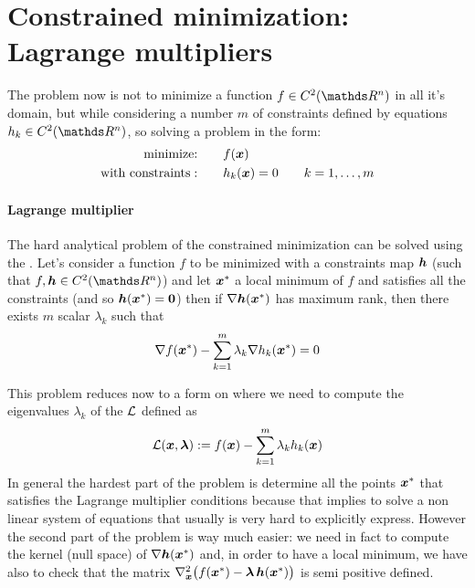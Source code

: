 \section{Constrained minimization: Lagrange multipliers}
	The problem now is not to minimize a function $f\in C^2(\R^n)$ in all it's domain, but while considering a number $m$ of constraints defined by equations $h_k\in C^2(\R^n)$, so solving a problem in the form:
	\begin{align*}
		\textrm{minimize:} \qquad & f(\boldsymbol{x}) \\
		\textrm{with constraints}: \qquad & h_k(\boldsymbol{x}) = 0 \qquad k = 1,\dots, m
	\end{align*}
	
	\paragraph{Lagrange multiplier} The hard analytical problem of the constrained minimization can be solved using the . Let's consider a function $f$ to be minimized with a constraints map $\boldsymbol{h}$ (such that $f,\vett h \in C^2(\R^n)$) and let $\boldsymbol{x}^*$ a local minimum of $f$ and satisfies all the constraints (and so $\boldsymbol{h}(\boldsymbol{x}^*) = \boldsymbol{0}$) then if $\nabla \boldsymbol{h}(\boldsymbol{x}^*)$ has maximum rank, then there exists $m$ scalar $\lambda_k$ such that
	\begin{equation}
		\nabla f(\boldsymbol{x}^*) - \sum_{k=1}^{m} \lambda_k \nabla h_k(\boldsymbol{x}^*) = 0
	\end{equation}
	
	This problem reduces now to a form on where we need to compute the eigenvalues $\lambda_k$ of the  $\mathcal L$ defined as 
	\begin{equation}
		\mathcal L (\boldsymbol{x},\boldsymbol{\lambda}) := f(\boldsymbol{x}) - \sum_{k=1}^m \lambda_k h_k(\boldsymbol{x}) 
	\end{equation}
	In general the hardest part of the problem is determine all the points $\boldsymbol{x}^*$ that satisfies the Lagrange multiplier conditions because that implies to solve a non linear system of equations that usually is very hard to explicitly express. However the second part of the problem is way much easier: we need in fact to compute the kernel (null space) of $\nabla \boldsymbol{h}(\boldsymbol{x}^*)$ and, in order to have a local minimum, we have also to check that the matrix $\nabla_{\boldsymbol{x}} ^2\big(f(\boldsymbol{x}^*) - \boldsymbol{\lambda} \, \boldsymbol{h}(\boldsymbol{x}^*)\big)$ is semi positive defined. \vspace{3mm}
	
